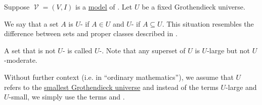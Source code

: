 \begin{definition}\label{def:large_and_small_sets}
  Suppose \( \mscrV = (V, I) \) is a \hyperref[def:first_order_semantics/satisfiability]{model} of . Let \( U \) be a fixed Grothendieck universe.

  We say that a set \( A \) is \( U \)- if \( A \in U \) and \( U \)- if \( A \subseteq U \). This situation resembles the difference between sets and proper classes described in .

  A set that is not \( U \)- is called \( U \)-. Note that any superset of \( U \) is \( U \)-large but not \( U \)-moderate.

  Without further context (i.e. in \enquote{ordinary mathematics}), we assume that \( U \) refers to the \hyperref[thm:smallest_grothendieck_universe_existence]{smallest Grothendieck universe} and instead of the terms \( U \)-large and \( U \)-small, we simply use the terms  and .
\end{definition}
